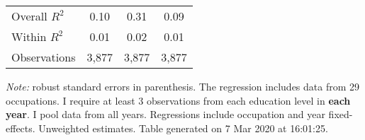 \begin{center}
\begin{threeparttable}[!h]
\begin{tabular}{lccc}
\midrule Overall $ R^2$&        0.10         &        0.31         &        0.09         \\
Within $ R^2$       &        0.01         &        0.02         &        0.01         \\
Observations        &       3,877         &       3,877         &       3,877         \\
\bottomrule
\bottomrule
\end{tabular}
\begin{tablenotes}
\item\footnotesize\textit{Note:} robust standard errors in parenthesis. The regression includes data from 29 occupations. I require at least 3 observations from each education level in \textbf{each year}. I pool data from all years. Regressions include occupation and year fixed-effects. Unweighted estimates. Table generated on  7 Mar 2020 at 16:01:25.
\end{tablenotes}
\end{threeparttable}
\end{center}
